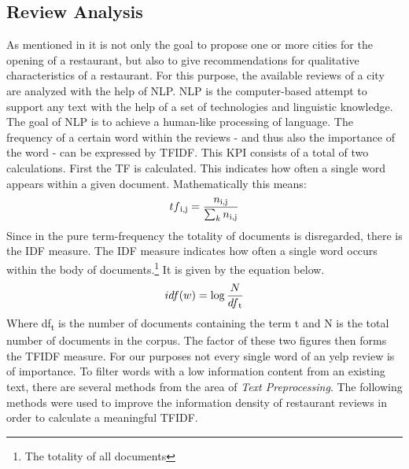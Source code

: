 \subsection{Review Analysis}
\label{subsec:review}
As mentioned in  it is not only the goal to propose one or more cities for the opening of a restaurant,
 but also to give recommendations for qualitative characteristics of a restaurant.
\newline
For this purpose, the available reviews of a city are analyzed with the help of \ac{NLP}.
\ac{NLP} is the computer-based attempt to support any text with the help of a set of technologies and linguistic knowledge.\cite{Liddy01}
The goal of \ac{NLP} is to achieve a human-like processing of language.\cite{Liddy01}
The frequency of a certain word within the reviews - and thus also the importance of the word - can be expressed by \ac{TFIDF}.
This \ac{KPI} consists of a total of two calculations.
First the \ac{TF} is calculated.
This indicates how often a single word appears within a given document.
Mathematically this means:
\newline
\begin{equation}
  tf\textsubscript{i,j} = \frac{n\textsubscript{i,j}}{\sum_{k} n\textsubscript{i,j}}
	\label{eq:tf}
\end{equation}
Since in the pure term-frequency the totality of documents is disregarded, there is the \ac{IDF} measure.
The \ac{IDF} measure indicates how often a single word occurs within the body of documents.\footnote{The totality of all documents}
It is given by the equation below.
\newline
\begin{equation}
  idf(w) = \log \frac{N}{df\textsubscript{t}}
	\label{eq:tf}
\end{equation}
Where df\textsubscript{t} is the number of documents containing the term t and N is the total number of documents in the corpus.
The factor of these two figures then forms the \ac{TFIDF} measure.\cite{droid18}
\newline
For our purposes not every single word of an yelp review is of importance.
To filter words with a low information content from an existing text, there are several methods from the area of \textit{Text Preprocessing}.
The following methods were used to improve the information density of restaurant reviews in order to calculate a meaningful \ac{TFIDF}.
